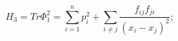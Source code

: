 \begin{equation}\label{H3}
  H_3=Tr \Phi_1^2= \sum_{i=1}^n p_i^2+  \sum_{i\neq j} \frac
  {f_{ij}f_{ji}} {(x_i-x_j)^2};
\end{equation}


